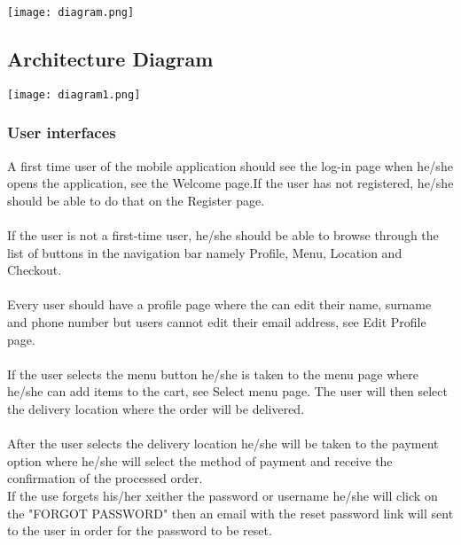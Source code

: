 \documentclass[12pt]{article}
\begin{document}
\texttt{[image: diagram.png]}

\subsection{Architecture Diagram}


\texttt{[image: diagram1.png]}

\subsubsection{User interfaces}
A first time user of the mobile application should see the log-in page when he/she opens the application, see the Welcome page.If the user has not registered, he/she should be able to do that on the Register page.\\
\\
If the user is not a first-time user, he/she should be able to browse through the list of buttons in the navigation bar namely Profile, Menu, Location and Checkout.\\
\\
Every user should have a profile page where the can edit their name, surname and phone number but users cannot edit their email address, see Edit Profile page.\\
\\
If the user selects the menu button he/she is taken to the menu page where he/she can add items to the cart, see Select menu page. The user will then select the delivery location where the order will be delivered.\\
\\
After the user selects the delivery location he/she will be taken to the payment option where he/she will select the method of payment and receive the confirmation of the processed order.\\
If the use forgets his/her xeither the password or username he/she will click on the "FORGOT PASSWORD" then an email with the reset password link will sent to the user in order for the password to be reset.
\newpage
\end{document}
